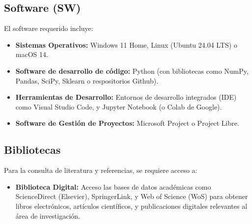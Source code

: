 \subsection{Software (SW)}
El software requerido incluye:
\begin{itemize}
    \item \textbf{Sistemas Operativos:} Windows 11 Home, Linux (Ubuntu 24.04 LTS) o macOS 14.
    \item \textbf{Software de desarrollo de código:} Python (con bibliotecas como NumPy, Pandas, SciPy, Sklearn o respositorios Github).
    \item \textbf{Herramientas de Desarrollo:} Entornos de desarrollo integrados (IDE) como Visual Studio Code, y Jupyter Notebook (o Colab de Google).
    \item \textbf{Software de Gestión de Proyectos:} Microsoft Project o Project Libre.
\end{itemize}

\subsection{Bibliotecas}
Para la consulta de literatura y referencias, se requiere acceso a:
\begin{itemize}
    \item \textbf{Biblioteca Digital:} Acceso las bases de datos académicas como ScienceDirect (Elsevier), SpringerLink, y Web of Science (WoS) para obtener libros electrónicos, artículos científicos, y publicaciones digitales relevantes al área de investigación.
\end{itemize}
